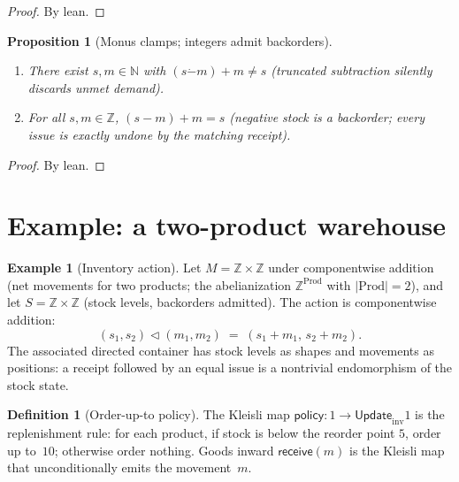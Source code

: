 \documentclass[11pt,a4paper]{article}
\theoremstyle{plain}
\newtheorem{proposition}[theorem]{Proposition}
\theoremstyle{definition}
\newtheorem{definition}[theorem]{Definition}
\newtheorem{example}[theorem]{Example}
\newcommand{\Update}{\mathsf{Update}}
\begin{document}
\begin{proof}
By lean.
\end{proof}

\begin{proposition}[Monus clamps; integers admit backorders]\label{prop:monus}
\begin{enumerate}
  \item There exist $s,m \in \mathbb{N}$ with
        $(s \mathbin{\dot{-}} m) + m \neq s$ (truncated subtraction
        silently discards unmet demand).
  \item For all $s,m \in \mathbb{Z}$,
        $(s - m) + m = s$ (negative stock is a backorder; every issue is
        exactly undone by the matching receipt).
\end{enumerate}
\end{proposition}

\begin{proof}
By lean.
\end{proof}

\section{Example: a two-product warehouse}

\begin{example}[Inventory action]\label{ex:warehouse}
Let $M = \mathbb{Z} \times \mathbb{Z}$ under componentwise addition (net
movements for two products; the abelianization $\mathbb{Z}^{\mathrm{Prod}}$
with $|\mathrm{Prod}| = 2$), and let $S = \mathbb{Z} \times \mathbb{Z}$
(stock levels, backorders admitted). The action is componentwise
addition:
\begin{equation}
  (s_1,s_2) \mathbin{\triangleleft} (m_1,m_2)
  \;=\;
  (s_1+m_1,\, s_2+m_2).
\end{equation}
The associated directed container has stock levels as shapes and
movements as positions: a receipt followed by an equal issue is a
nontrivial endomorphism of the stock state.
\end{example}

\begin{definition}[Order-up-to policy]\label{def:policy}
The Kleisli map $\mathsf{policy} : 1 \to \Update_{\mathrm{inv}} 1$ is the
replenishment rule: for each product, if stock is below the reorder point
$5$, order up to~$10$; otherwise order nothing. Goods inward
$\mathsf{receive}(m)$ is the Kleisli map that unconditionally emits the
movement~$m$.
\end{definition}
\end{document}
